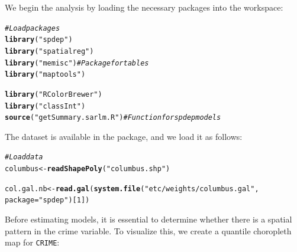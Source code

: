 \documentclass[english,12pt]{book}\usepackage[]{graphicx}\usepackage[]{xcolor}
\makeatletter
\newcommand{\hlnum}[1]{\textcolor[rgb]{0.686,0.059,0.569}{#1}}%
\newcommand{\hlsng}[1]{\textcolor[rgb]{0.192,0.494,0.8}{#1}}%
\newcommand{\hlcom}[1]{\textcolor[rgb]{0.678,0.584,0.686}{\textit{#1}}}%
\newcommand{\hldef}[1]{\textcolor[rgb]{0.345,0.345,0.345}{#1}}%
\newcommand{\hlkwb}[1]{\textcolor[rgb]{0.69,0.353,0.396}{#1}}%
\newcommand{\hlkwc}[1]{\textcolor[rgb]{0.333,0.667,0.333}{#1}}%
\newcommand{\hlkwd}[1]{\textcolor[rgb]{0.737,0.353,0.396}{\textbf{#1}}}%
\newenvironment{kframe}{%
 \def\at@end@of@kframe{}%
 \ifinner\ifhmode%
  \def\at@end@of@kframe{\end{minipage}}%
  \begin{minipage}{\columnwidth}%
 \fi\fi%
 \def\FrameCommand##1{\hskip\@totalleftmargin \hskip-\fboxsep
 \colorbox{shadecolor}{##1}\hskip-\fboxsep
     \hskip-\linewidth \hskip-\@totalleftmargin \hskip\columnwidth}%
 \MakeFramed {\advance\hsize-\width
   \@totalleftmargin\z@ \linewidth\hsize
   \@setminipage}}%
 {\par\unskip\endMakeFramed%
 \at@end@of@kframe}
\newenvironment{knitrout}{}{} %
\makeatother
\begin{document}
We begin the analysis by loading the necessary  packages into the workspace:

\begin{knitrout}
\color{fgcolor}\begin{kframe}
\begin{alltt}
\hlcom{# Load packages}
\hlkwd{library}\hldef{(}\hlsng{"spdep"}\hldef{)}
\hlkwd{library}\hldef{(}\hlsng{"spatialreg"}\hldef{)}
\hlkwd{library}\hldef{(}\hlsng{"memisc"}\hldef{)}            \hlcom{# Package for tables}
\hlkwd{library}\hldef{(}\hlsng{"maptools"}\hldef{)}
\end{alltt}


{\ttfamily\noindent\bfseries{}}\begin{alltt}
\hlkwd{library}\hldef{(}\hlsng{"RColorBrewer"}\hldef{)}
\hlkwd{library}\hldef{(}\hlsng{"classInt"}\hldef{)}
\hlkwd{source}\hldef{(}\hlsng{"getSummary.sarlm.R"}\hldef{)} \hlcom{# Function for spdep models}
\end{alltt}
\end{kframe}
\end{knitrout}

The dataset is available in the  package, and we load it as follows:

\begin{knitrout}
\color{fgcolor}\begin{kframe}
\begin{alltt}
\hlcom{# Load data}
\hldef{columbus}   \hlkwb{<-} \hlkwd{readShapePoly}\hldef{(}\hlsng{"columbus.shp"}\hldef{)}
\end{alltt}


{\ttfamily\noindent\bfseries{}}\begin{alltt}
\hldef{col.gal.nb} \hlkwb{<-} \hlkwd{read.gal}\hldef{(}\hlkwd{system.file}\hldef{(}\hlsng{"etc/weights/columbus.gal"}\hldef{,}
                                   \hlkwc{package} \hldef{=} \hlsng{"spdep"}\hldef{)[}\hlnum{1}\hldef{])}
\end{alltt}
\end{kframe}
\end{knitrout}

Before estimating models, it is essential to determine whether there is a spatial pattern in the crime variable. To visualize this, we create a quantile choropleth map for \texttt{CRIME}:
\end{document}

